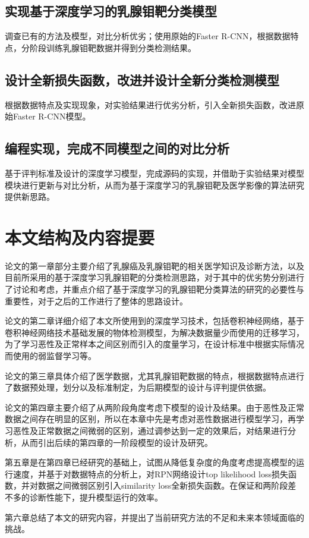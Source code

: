 \subsection{实现基于深度学习的乳腺钼靶分类模型}
调查已有的方法及模型，对比分析优劣；使用原始的Faster R-CNN，根据数据特点，分阶段训练乳腺钼靶数据并得到分类检测结果。
\subsection{设计全新损失函数，改进并设计全新分类检测模型}
根据数据特点及实现现象，对实验结果进行优劣分析，引入全新损失函数，改进原始Faster R-CNN模型。
\subsection{编程实现，完成不同模型之间的对比分析}
基于评判标准及设计的深度学习模型，完成源码的实现，并借助于实验结果对模型模块进行更新与对比分析，从而为基于深度学习的乳腺钼靶及医学影像的算法研究提供新思路。
\section{本文结构及内容提要}
论文的第一章部分主要介绍了乳腺癌及乳腺钼靶的相关医学知识及诊断方法，以及目前所采用的基于深度学习乳腺钼靶的分类检测思路，对于其中的优劣势分别进行了讨论和考虑，并重点介绍了基于深度学习的乳腺钼靶分类算法的研究的必要性与重要性，对于之后的工作进行了整体的思路设计。

论文的第二章详细介绍了本文所使用到的深度学习技术，包括卷积神经网络，基于卷积神经网络技术基础发展的物体检测模型，为解决数据量少而使用的迁移学习，为了学习恶性及正常样本之间区别而引入的度量学习，在设计标准中根据实际情况而使用的弱监督学习等。

论文的第三章具体介绍了医学数据，尤其乳腺钼靶数据的特点，根据数据特点进行了数据预处理，划分以及标准制定，为后期模型的设计与评判提供依据。

论文的第四章主要介绍了从两阶段角度考虑下模型的设计及结果。由于恶性及正常数据之间存在明显的区别，所以在本章中先是考虑对恶性数据进行模型学习，再学习恶性及正常数据之间微弱的区别，通过调参达到一定的效果后，对结果进行分析，从而引出后续的第四章的一阶段模型的设计及研究。

第五章是在第四章已经研究的基础上，试图从降低复杂度的角度考虑提高模型的运行速度，并基于对数据特点的分析上，对RPN网络设计top likelihood loss损失函数，并对数据之间微弱区别引入similarity loss全新损失函数。在保证和两阶段差不多的诊断性能下，提升模型运行的效率。

第六章总结了本文的研究内容，并提出了当前研究方法的不足和未来本领域面临的挑战。

